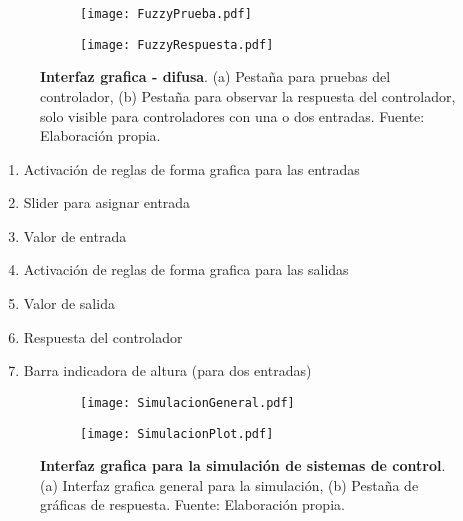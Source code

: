     \begin{figure}[h!]
        \centering
        \begin{subfigure}[t]{\textwidth}
            \centering
            \texttt{[image: FuzzyPrueba.pdf]}
            \caption{}
            \label{fig:FuzzyPrueba}
        \end{subfigure}
        \hfill
        \begin{subfigure}[t]{\textwidth}
            \centering
            \texttt{[image: FuzzyRespuesta.pdf]}
            \caption{}
            \label{fig:FuzzyRespuesta}
        \end{subfigure}
        \caption[Interfaz grafica - difusa - prueba y respuesta]{\textbf{Interfaz grafica - difusa}. (a) Pestaña para pruebas del controlador, (b) Pestaña para observar la respuesta del controlador, solo visible para controladores con una o dos entradas. Fuente: Elaboración propia. \label{fig:interfazFuzzyCrear}}
    \end{figure}

    \begin{multicols}{2}
        \begin{enumerate}[leftmargin=20pt]
            \item Activación de reglas de forma grafica para las entradas
            \item Slider para asignar entrada
            \item Valor de entrada
            \item Activación de reglas de forma grafica para las salidas
            \item Valor de salida
            \item Respuesta del controlador
            \item Barra indicadora de altura (para dos entradas)
        \end{enumerate}
    \end{multicols}

    \begin{figure}[h!]
        \centering
        \begin{subfigure}[t]{\textwidth}
            \centering
            \texttt{[image: SimulacionGeneral.pdf]}
            \caption{}
            \label{fig:SimulacionGeneral}
        \end{subfigure}
        \hfill
        \begin{subfigure}[t]{\textwidth}
            \centering
            \texttt{[image: SimulacionPlot.pdf]}
            \caption{}
            \label{fig:SimulacionPlot}
        \end{subfigure}
        \caption[Interfaz grafica para la simulación de sistemas de control]{\textbf{Interfaz grafica para la simulación de sistemas de control}. (a) Interfaz grafica general para la simulación, (b) Pestaña de gráficas de respuesta. Fuente: Elaboración propia. \label{fig:SimulacionFront}}
    \end{figure}

